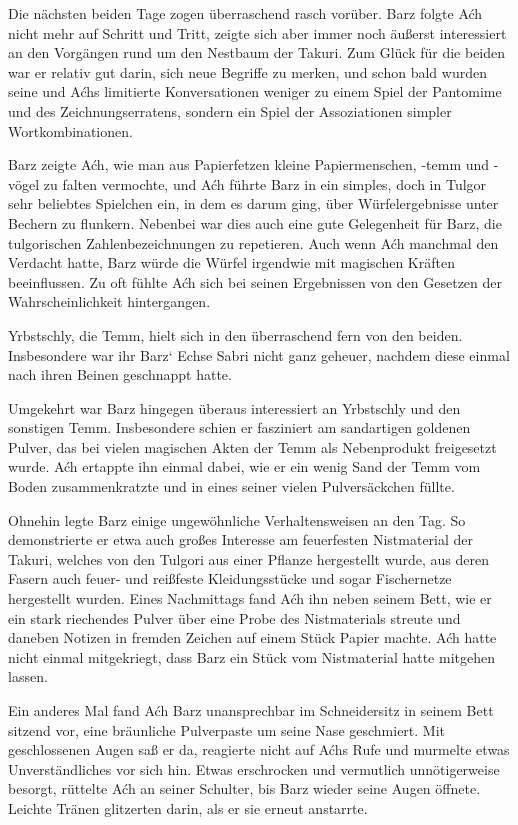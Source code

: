 Die nächsten beiden Tage zogen überraschend rasch vorüber. Barz folgte Aćh nicht mehr auf Schritt und Tritt, zeigte sich aber immer noch äußerst interessiert an den Vorgängen rund um den Nestbaum der Takuri. Zum Glück für die beiden war er relativ gut darin, sich neue Begriffe zu merken, und schon bald wurden seine und Aćhs limitierte Konversationen weniger zu einem Spiel der Pantomime und des Zeichnungserratens, sondern ein Spiel der Assoziationen simpler Wortkombinationen.

Barz zeigte Aćh, wie man aus Papierfetzen kleine Papiermenschen, -temm und -vögel zu falten vermochte, und Aćh führte Barz in ein simples, doch in Tulgor sehr beliebtes Spielchen ein, in dem es darum ging, über Würfelergebnisse unter Bechern zu flunkern. Nebenbei war dies auch eine gute Gelegenheit für Barz, die tulgorischen Zahlenbezeichnungen zu repetieren. Auch wenn Aćh manchmal den Verdacht hatte, Barz würde die Würfel irgendwie mit magischen Kräften beeinflussen. Zu oft fühlte Aćh sich bei seinen Ergebnissen von den Gesetzen der Wahrscheinlichkeit hintergangen.

Yrbstschly, die Temm, hielt sich in den überraschend fern von den beiden. Insbesondere war ihr Barz‘ Echse Sabri nicht ganz geheuer, nachdem diese einmal nach ihren Beinen geschnappt hatte.

Umgekehrt war Barz hingegen überaus interessiert an Yrbstschly und den sonstigen Temm. Insbesondere schien er fasziniert am sandartigen goldenen Pulver, das bei vielen magischen Akten der Temm als Nebenprodukt freigesetzt wurde. Aćh ertappte ihn einmal dabei, wie er ein wenig Sand der Temm vom Boden zusammenkratzte und in eines seiner vielen Pulversäckchen füllte.

Ohnehin legte Barz einige ungewöhnliche Verhaltensweisen an den Tag. So demonstrierte er etwa auch großes Interesse am feuerfesten Nistmaterial der Takuri, welches von den Tulgori aus einer Pflanze hergestellt wurde, aus deren Fasern auch feuer- und reißfeste Kleidungsstücke und sogar Fischernetze hergestellt wurden. Eines Nachmittags fand Aćh ihn neben seinem Bett, wie er ein stark riechendes Pulver über eine Probe des Nistmaterials streute und daneben Notizen in fremden Zeichen auf einem Stück Papier machte. Aćh hatte nicht einmal mitgekriegt, dass Barz ein Stück vom Nistmaterial hatte mitgehen lassen.\bigskip







Ein anderes Mal fand Aćh Barz unansprechbar im Schneidersitz in seinem Bett sitzend vor, eine bräunliche Pulverpaste um seine Nase geschmiert. Mit geschlossenen Augen saß er da, reagierte nicht auf Aćhs Rufe und murmelte etwas Unverständliches vor sich hin. Etwas erschrocken und vermutlich unnötigerweise besorgt, rüttelte Aćh an seiner Schulter, bis Barz wieder seine Augen öffnete. Leichte Tränen glitzerten darin, als er sie erneut anstarrte.

